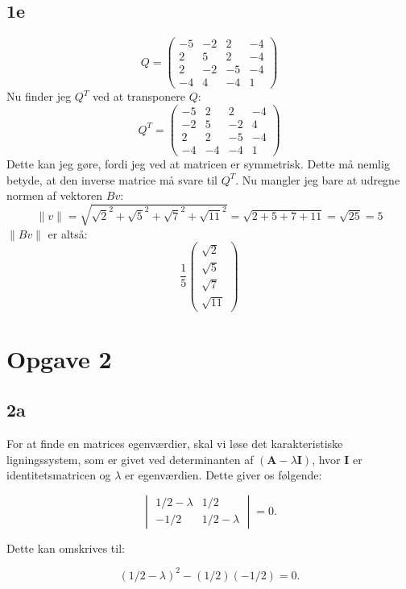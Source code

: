 \documentclass{article}
\begin{document}
\subsection*{1e}
$$
Q=\left(\begin{array}{cccc}
-5 & -2 & 2 & -4 \\
2 & 5 & 2 & -4 \\
2 & -2 & -5 & -4 \\
-4 & 4 & -4 & 1
\end{array}\right)
$$
Nu finder jeg $Q^T$ ved at transponere $Q$:
$$
Q^T=\left(\begin{array}{cccc}
-5 & 2 & 2 & -4 \\
-2 & 5 & -2 & 4 \\
2 & 2 & -5 & -4 \\
-4 & -4 & -4 & 1
\end{array}\right)
$$
Dette kan jeg gøre, fordi jeg ved at matricen er symmetrisk. Dette må nemlig betyde, at den inverse matrice må svare til $Q^T$. Nu mangler jeg bare at udregne normen af vektoren $Bv$:
$$
\|v\|=\sqrt{\sqrt{2}^2+\sqrt{5}^2+\sqrt{7}^2+\sqrt{11}^2}=\sqrt{2+5+7+11}=\sqrt{25}=5
$$
$\|B v\|$ er altså:
$$
\frac{1}{5}\left(\begin{array}{c}
\sqrt{2} \\
\sqrt{5} \\
\sqrt{7} \\
\sqrt{11}
\end{array}\right)
$$

\section*{Opgave 2}
\subsection*{2a}
For at finde en matrices egenværdier, skal vi løse det karakteristiske ligningssystem, som er givet ved determinanten af $(\mathbf{A} - \lambda\mathbf{I})$, hvor $\mathbf{I}$ er identitetsmatricen og $\lambda$ er egenværdien. Dette giver os følgende:

\begin{equation}
\begin{vmatrix}
1/2 - \lambda & 1/2 \\
-1/2 & 1/2 - \lambda
\end{vmatrix} = 0.
\end{equation}

Dette kan omskrives til:

\begin{equation}
(1/2 - \lambda)^2 - (1/2)(-1/2) = 0.
\end{equation}
\end{document}
